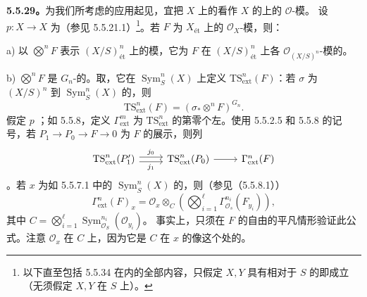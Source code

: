 \textbf{5.5.29。}为我们所考虑的应用起见，宜把 $X$ 上的看作 $X$ 的上的 $\mathscr O$-模。
设 $p:X\to X$ 为（参见 5.5.21.1）\footnote{以下直至包括 5.5.34 在内的全部内容，只假定 $X,Y$ 具有相对于 $S$ 的即成立（无须假定 $X,Y$ 在 $S$ 上）。}。若 $F$ 为 $X_{\text{ét}}$ 上的 $\mathscr O_X$-模，则：

a) 以 $\bigotimes^nF$ 表示 $(X/S)^n_{\text{ét}}$ 上的模，它为 $F$ 在 $(X/S)^n_{\text{ét}}$ 上各 $\mathscr O_{(X/S)^n}$-模的。

b)  $\bigotimes^nF$ 是 $G_n$-的。取，它在 $\operatorname{Sym}^n_S(X)$ 上定义 $\mathrm{TS}^n_{\mathrm{ext}}(F)$：若 $\sigma$ 为 $(X/S)^n$ 到 $\operatorname{Sym}^n_S(X)$ 的，则
\begin{equation}\tag{5.5.29.1}\mathrm{TS}^n_{\mathrm{ext}}(F)=(\sigma_*\mathop{\otimes}\nolimits^nF)^{G_n}.\end{equation}
假定 $p$ ；如 5.5.8，定义 $\Gamma^m_{\mathrm{ext}}$ 为 $\mathrm{TS}^n_{\mathrm{ext}}$ 的第零个左。使用 5.5.2.5 和 5.5.8 的记号，若 $P_1\to P_0\to F\to0$ 为 $F$ 的展示，则列
\[\begin{tikzcd}
\mathrm{TS}^n_{\mathrm{ext}}(P'_1)\arrow[r,shift left,"j_0"]\arrow[r,shift right,"j_1"']&\mathrm{TS}^n_{\mathrm{ext}}(P_0)\arrow[r]&\Gamma^n_{\mathrm{ext}}(F)
\end{tikzcd}\]
。若 $x$ 为如 5.5.7.1 中的 $\operatorname{Sym}^n_S(X)$ 的，则（参见（5.5.8.1））
\begin{equation}\tag{5.5.29.2}\Gamma^n_{\mathrm{ext}}(F)_x=\mathscr O_x\otimes_C\left(\bigotimes_{i=1}^{\ell}\Gamma^{n_i}_{\mathscr O_s}(F_{y_i})\right),\end{equation}
其中 $C=\bigotimes_{i=1}^{\ell}\operatorname{Sym}^{n_i}_{\mathscr O_S}(\mathscr O_{y_i})$。
事实上，只须在 $F$ 的自由的平凡情形验证此公式。注意 $\mathscr O_x$ 在 $C$ 上，因为它是 $C$ 在 $x$ 的像这个处的。


